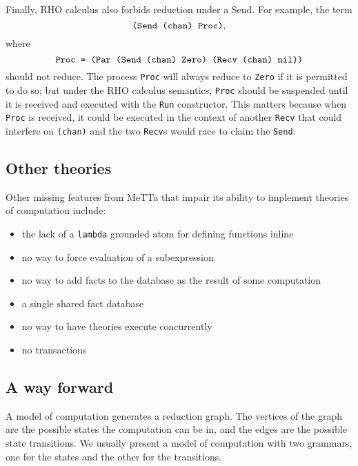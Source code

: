 \documentclass{article}
\begin{document}
Finally, RHO calculus also forbids reduction under a Send.  For example, the term 
\[\mbox{\tt(Send (chan) Proc)},\]
where
\[\mbox{\tt Proc = (Par (Send (chan) Zero) (Recv (chan) nil))}\]
should not reduce.  The process \verb+Proc+ will always reduce to \verb+Zero+ if it is permitted to do so; but under the RHO calculus semantics, \verb+Proc+ should be suspended until it is received and executed with the \verb+Run+ constructor.  This matters because when \verb+Proc+ is received, it could be executed in the context of another \verb+Recv+ that could interfere on \verb+(chan)+ and the two \verb+Recv+s would race to claim the \verb+Send+.

\subsection{Other theories}

Other missing features from MeTTa that impair its ability to implement theories of computation include:
\begin{itemize}
    \item the lack of a \verb+lambda+ grounded atom for defining functions inline
    \item no way to force evaluation of a subexpression
    \item no way to add facts to the database as the result of some computation
    \item a single shared fact database
    \item no way to have theories execute concurrently
    \item no transactions
\end{itemize}

\subsection{A way forward}

A model of computation generates a reduction graph.  The vertices of the graph are the possible states the computation can be in, and the edges are the possible state transitions.  We usually present a model of computation with two grammars, one for the states and the other for the transitions.
\end{document}
